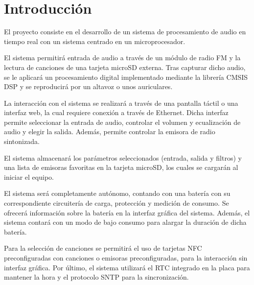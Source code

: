 \section{Introducción}

El proyecto consiste en el desarrollo de un sistema de procesamiento de audio en tiempo real con un sistema centrado en un microprocesador.

El sistema permitirá entrada de audio a través de un módulo de radio FM y la lectura de canciones de una tarjeta microSD externa. Tras capturar dicho audio, se le aplicará un procesamiento digital implementado mediante la librería CMSIS DSP y se reproducirá por un altavoz o unos auriculares.

La interacción con el sistema se realizará a través de una pantalla táctil o una interfaz web, la cual requiere conexión a través de Ethernet. Dicha interfaz permite seleccionar la entrada de audio, controlar el volumen y ecualización de audio y elegir la salida. Además, permite controlar la emisora de radio sintonizada.

El sistema almacenará los parámetros seleccionados (entrada, salida y filtros) y una lista de emisoras favoritas en la tarjeta microSD, los cuales se cargarán al iniciar el equipo.

El sistema será completamente autónomo, contando con una batería con su correspondiente circuitería de carga, protección y medición de consumo. Se ofrecerá información sobre la batería en la interfaz gráfica del sistema. Además, el sistema contará con un modo de bajo consumo para alargar la duración de dicha batería.

Para la selección de canciones se permitirá el uso de tarjetas NFC preconfiguradas con canciones o emisoras preconfiguradas, para la interacción sin interfaz gráfica. Por último, el sistema utilizará el RTC integrado en la placa para mantener la hora y el protocolo SNTP para la sincronización.

